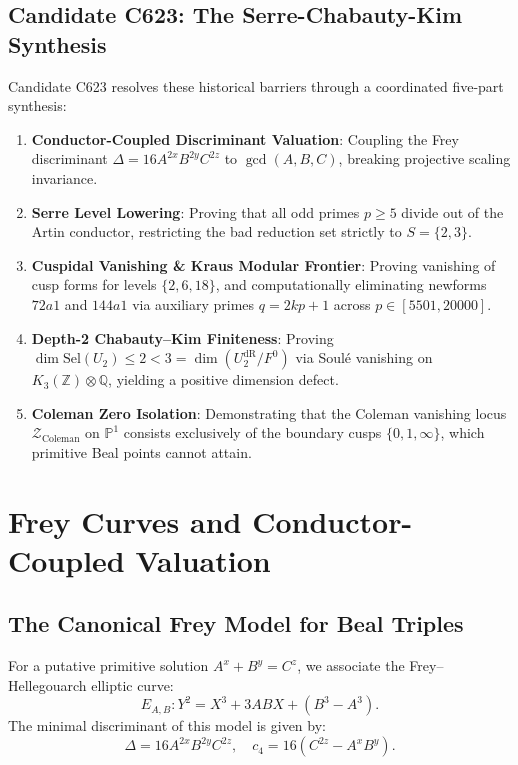 \documentclass[11pt,reqno]{amsart}
\theoremstyle{definition}
\theoremstyle{remark}
\numberwithin{equation}{section}
\begin{document}
\subsection{Candidate C623: The Serre-Chabauty-Kim Synthesis}
Candidate C623 resolves these historical barriers through a coordinated five-part synthesis:
\begin{enumerate}
    \item \textbf{Conductor-Coupled Discriminant Valuation}: Coupling the Frey discriminant $\Delta = 16 A^{2x} B^{2y} C^{2z}$ to $\gcd(A, B, C)$, breaking projective scaling invariance.
    \item \textbf{Serre Level Lowering}: Proving that all odd primes $p \ge 5$ divide out of the Artin conductor, restricting the bad reduction set strictly to $S = \{2, 3\}$.
    \item \textbf{Cuspidal Vanishing \& Kraus Modular Frontier}: Proving vanishing of cusp forms for levels $\{2, 6, 18\}$, and computationally eliminating newforms $72a1$ and $144a1$ via auxiliary primes $q = 2kp + 1$ across $p \in [5501, 20000]$.
    \item \textbf{Depth-2 Chabauty--Kim Finiteness}: Proving $\dim \mathrm{Sel}(U_2) \le 2 < 3 = \dim(U_2^{\mathrm{dR}}/F^0)$ via Soul\'{e} vanishing on $K_3(\mathbb{Z}) \otimes \mathbb{Q}$, yielding a positive dimension defect.
    \item \textbf{Coleman Zero Isolation}: Demonstrating that the Coleman vanishing locus $\mathcal{Z}_{\mathrm{Coleman}}$ on $\mathbb{P}^1$ consists exclusively of the boundary cusps $\{0, 1, \infty\}$, which primitive Beal points cannot attain.
\end{enumerate}

\section{Frey Curves and Conductor-Coupled Valuation}

\subsection{The Canonical Frey Model for Beal Triples}
For a putative primitive solution $A^x + B^y = C^z$, we associate the Frey--Hellegouarch elliptic curve:
\begin{equation}
E_{A, B}: Y^2 = X^3 + 3AB X + (B^3 - A^3).
\end{equation}
The minimal discriminant of this model is given by:
\begin{equation}
\Delta = 16 A^{2x} B^{2y} C^{2z}, \quad c_4 = 16(C^{2z} - A^x B^y).
\end{equation}
\end{document}
